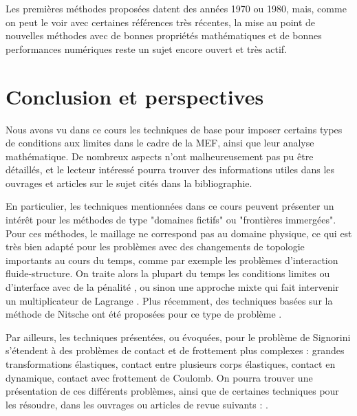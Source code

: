 \documentclass[11pt]{book}
\begin{document}
Les premières méthodes proposées datent des années 1970 ou 1980, mais, comme on peut le voir avec certaines références très récentes, la mise au point de nouvelles méthodes avec de bonnes propriétés mathématiques et de bonnes performances numériques reste un sujet encore ouvert et très actif.

\chapter{Conclusion et perspectives}

Nous avons vu dans ce cours les techniques de base pour imposer certains types de conditions aux limites dans le cadre de la MEF, ainsi que leur analyse mathématique. De nombreux aspects n'ont malheureusement pas pu être détaillés, et le lecteur intéressé pourra trouver des informations utiles dans les ouvrages et articles sur le sujet cités dans la bibliographie. 

En particulier, les techniques mentionnées dans ce cours peuvent présenter un intérêt pour %
les méthodes de type "domaines fictifs" ou "frontières immergées". Pour ces méthodes, le maillage ne correspond pas au domaine physique, ce qui est très bien adapté pour les problèmes avec des changements de topologie importants au cours du temps, comme par exemple les problèmes d'interaction fluide-structure. On traite alors la plupart du temps les conditions limites ou d'interface avec de la pénalité \cite{ramiere-2007}, ou sinon une approche mixte qui fait intervenir un multiplicateur de Lagrange \cite{baaijens-2001}. Plus récemment, des techniques basées sur la méthode de Nitsche ont été proposées pour ce type de problème \cite{alauzet-2016,burman-fernandez-2014}.

Par ailleurs, les techniques présentées, ou évoquées, pour le problème de Signorini s'étendent à des problèmes de contact et de frottement plus complexes : grandes transformations élastiques, contact entre plusieurs corps élastiques, contact en dynamique, contact avec frottement de Coulomb. On pourra trouver une présentation de ces différents problèmes, ainsi que de certaines techniques pour les résoudre, dans les ouvrages ou articles de revue suivants : \cite{chouly2016overview,kikuchi-oden-88,wohlmuth-11}.







\end{document}
